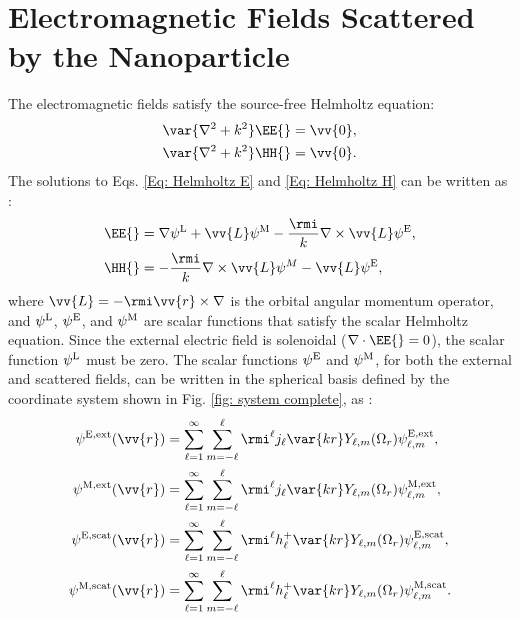 \section{Electromagnetic Fields Scattered by the Nanoparticle}
The electromagnetic fields satisfy the source-free Helmholtz equation:
\begin{align}
\var{\nabla^2+k^2}\EE{} = \vv{0},\label{Eq: Helmholtz E}\\
\var{\nabla^2+k^2}\HH{} = \vv{0}.\label{Eq: Helmholtz H}
\end{align}
The solutions to Eqs. \eqref{Eq: Helmholtz E} and \eqref{Eq: Helmholtz H} can be written as \cite{Low}:
\begin{align}
\EE{} &= \nabla\psi^{\rm L} + \vv{L}\psi^{\rm M}-\frac{\rmi}{k}\nabla\times\vv{L}\psi^{\rm E}, \label{Eq: E field in terms of potentials}\\
\HH{} &= -\frac{\rmi}{k}\nabla\times\vv{L}\psi^{M}-\vv{L}\psi^{\rm E}, \label{Eq: H field in terms of potentials}
\end{align}
where $\vv{L}=-\rmi \vv{r}\times\nabla$ is the orbital angular momentum operator, and $\psi^{\rm L}$, $\psi^{\rm E}$, and $\psi^{\rm M}$ are scalar functions that satisfy the scalar Helmholtz equation. Since the external electric field is solenoidal ($\nabla\cdot\EE{}=0$), the scalar function $\psi^{\rm L}$ must be zero. The scalar functions $\psi^{\rm E}$ and $\psi^{\rm M}$, for both the external and scattered fields, can be written in the spherical basis defined by the coordinate system shown in Fig. \ref{fig: system complete}, as \cite{de1999relativistic}:
\begin{align}
\psi^{\rm E, \text{ext}}(\vv{r})&=\sum_{\ell =1}^{\infty}\sum_{m=-\ell}^{\ell}\rmi^{\ell}j_{\ell}\var{kr}Y_{\ell, m}(\Omega_r)\psi_{\ell, m}^{\rm E, \text{ext}},\\
\psi^{\rm M, \text{ext}}(\vv{r})&=\sum_{\ell =1}^{\infty}\sum_{m=-\ell}^{\ell}\rmi^{\ell}j_{\ell}\var{kr}Y_{\ell, m}(\Omega_r)\psi_{\ell, m}^{\rm M, \text{ext}},\\
\psi^{\rm E, \text{scat}}(\vv{r})&=\sum_{\ell =1}^{\infty}\sum_{m=-\ell}^{\ell}\rmi^{\ell}h_{\ell}^{+}\var{kr}Y_{\ell, m}(\Omega_r)\psi_{\ell, m}^{\rm E, \text{scat}},\\
\psi^{\rm M, \text{scat}}(\vv{r})&=\sum_{\ell =1}^{\infty}\sum_{m=-\ell}^{\ell}\rmi^{\ell}h_{\ell}^{+}\var{kr}Y_{\ell, m}(\Omega_r)\psi_{\ell, m}^{\rm M, \text{scat}}.
\end{align}
